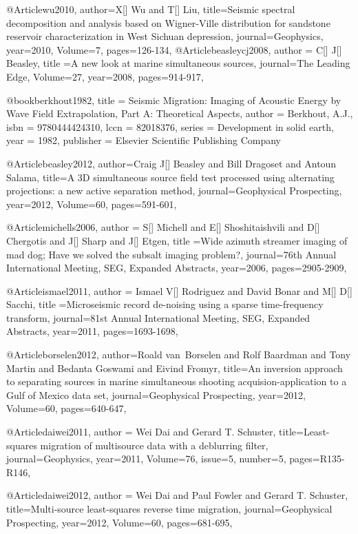 {@Article{wu2010,
  author={X[] Wu and T[] Liu},
  title={Seismic spectral decomposition and analysis based on Wigner-Ville distribution for sandstone reservoir characterization in West Sichuan depression},
  journal={Geophysics},
  year=2010,
  Volume=7,
  pages={126-134},
}
@Article{beasleycj2008,
  author = {C[] J[] Beasley},
  title ={A new look at marine simultaneous sources},
  journal={The Leading Edge},
  Volume=27,
  year=2008,
  pages={914-917},
}

@book{berkhout1982,
title     = {Seismic Migration: Imaging of Acoustic Energy by Wave Field Extrapolation, Part A: Theoretical Aspects},
author    = {Berkhout, A.J.},
isbn      = {9780444424310},
lccn      = {82018376},
series    = {Development in solid earth},
year      = {1982},
publisher = {Elsevier Scientific Publishing Company}
}

@Article{beasley2012,
  author={Craig J[] Beasley and Bill Dragoset and Antoun Salama},
  title={A 3{D} simultaneous source field test processed using alternating projections: a new active separation method},
  journal={Geophysical Prospecting},
  year=2012,
  Volume=60,
  pages={591-601},
}

@Article{michells2006,
  author = {S[] Michell and E[] Shoshitaishvili and D[] Chergotis and J[] Sharp and J[] Etgen},
  title ={Wide azimuth streamer imaging of mad dog; Have we solved the subsalt imaging problem?},
  journal={76th Annual International Meeting, SEG, Expanded Abstracts},
  year=2006,
  pages={2905-2909},
}

@Article{ismael2011,
  author = {Ismael V[] Rodriguez and David Bonar and M[] D[] Sacchi},
  title ={Microseismic record de-noising using a sparse time-frequency transform},
  journal={81st Annual International Meeting, SEG, Expanded Abstracts},
  year=2011,
  pages={1693-1698},
}

@Article{borselen2012,
  author={Roald van~Borselen and Rolf Baardman and Tony Martin and Bedanta Goswami and Eivind Fromyr},
  title={An inversion approach to separating sources in marine simultaneous shooting acquision-application to a Gulf of Mexico data set},
  journal={Geophysical Prospecting},
  year=2012,
  Volume=60,
  pages={640-647},
}

@Article{daiwei2011,
  author = {Wei Dai and Gerard T. Schuster},
  title={Least-squares migration of multisource data with a deblurring filter},
  journal={Geophysics},
  year=2011,
  Volume=76,
  issue=5,
  number=5,
  pages={R135-R146},
}

@Article{daiwei2012,
  author = {Wei Dai and Paul Fowler and Gerard T. Schuster},
  title={Multi-source least-squares reverse time migration},
  journal={Geophysical Prospecting},
  year=2012,
  Volume=60,
  pages={681-695},
}
	
}
